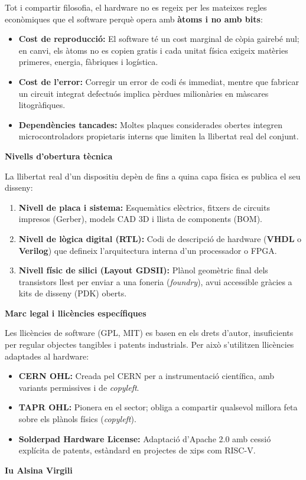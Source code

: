 \documentclass[catalan, a4paper]{article}
\begin{document}
Tot i compartir filosofia, el hardware no es regeix per les mateixes regles econòmiques que el software perquè opera amb \textbf{àtoms i no amb bits}:
\begin{itemize}
    \item \textbf{Cost de reproducció:} El software té un cost marginal de còpia gairebé nul; en canvi, els àtoms no es copien gratis i cada unitat física exigeix matèries primeres, energia, fàbriques i logística.
    \item \textbf{Cost de l'error:} Corregir un error de codi és immediat, mentre que fabricar un circuit integrat defectuós implica pèrdues milionàries en màscares litogràfiques.
    \item \textbf{Dependències tancades:} Moltes plaques considerades obertes integren microcontroladors propietaris interns que limiten la llibertat real del conjunt.
\end{itemize}

\textbf{Nivells d'obertura tècnica}

La llibertat real d'un dispositiu depèn de fins a quina capa física es publica el seu disseny:
\begin{enumerate}
    \item \textbf{Nivell de placa i sistema:} Esquemàtics elèctrics, fitxers de circuits impresos (Gerber), models CAD 3D i llista de components (BOM).
    \item \textbf{Nivell de lògica digital (RTL):} Codi de descripció de hardware (\textbf{VHDL} o \textbf{Verilog}) que defineix l'arquitectura interna d'un processador o FPGA.
    \item \textbf{Nivell físic de silici (Layout GDSII):} Plànol geomètric final dels transistors llest per enviar a una foneria (\textit{foundry}), avui accessible gràcies a kits de disseny (PDK) oberts.
\end{enumerate}

\textbf{Marc legal i llicències específiques}

Les llicències de software (GPL, MIT) es basen en els drets d'autor, insuficients per regular objectes tangibles i patents industrials. Per això s'utilitzen llicències adaptades al hardware:
\begin{itemize}
    \item \textbf{CERN OHL:} Creada pel CERN per a instrumentació científica, amb variants permissives i de \textit{copyleft}.
    \item \textbf{TAPR OHL:} Pionera en el sector; obliga a compartir qualsevol millora feta sobre els plànols físics (\textit{copyleft}).
    \item \textbf{Solderpad Hardware License:} Adaptació d'Apache 2.0 amb cessió explícita de patents, estàndard en projectes de xips com RISC-V.
\end{itemize}
\clearpage
{\bfseries\color{accent} Iu Alsina Virgili \par}\vspace{-0.4cm}
\end{document}
